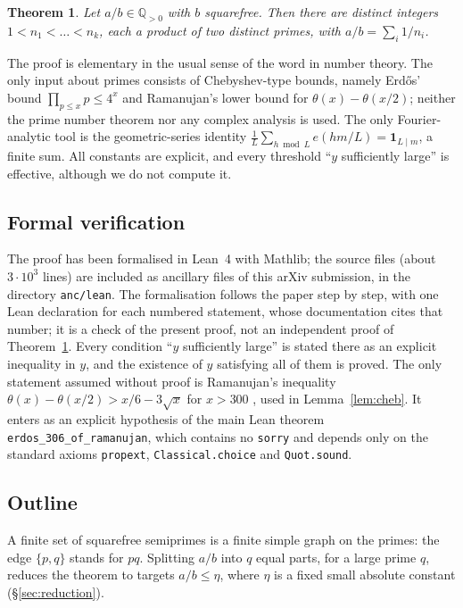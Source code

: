 \documentclass[11pt]{amsart}
\newtheorem{theorem}{Theorem}[section]
\theoremstyle{definition}
\theoremstyle{remark}
\newcommand{\Q}{\mathbb{Q}}
\begin{document}
\begin{theorem}\label{thm:main}
Let $a/b\in\Q_{>0}$ with $b$ squarefree. Then there are distinct integers $1<n_1<\dots<n_k$, each a product of two distinct primes, with $a/b=\sum_{i}1/n_i$.
\end{theorem}

The proof is elementary in the usual sense of the word in number theory. The only input about primes consists of Chebyshev-type bounds, namely Erd\H{o}s' bound $\prod_{p\le x}p\le4^x$ and Ramanujan's lower bound for $\theta(x)-\theta(x/2)$; neither the prime number theorem nor any complex analysis is used. The only Fourier-analytic tool is the geometric-series identity $\frac1L\sum_{h\bmod L}e(hm/L)=\mathbf 1_{L\mid m}$, a finite sum. All constants are explicit, and every threshold ``$y$ sufficiently large'' is effective, although we do not compute it.

\subsection*{Formal verification}\label{sec:lean}
The proof has been formalised in Lean~4 with Mathlib; the source files (about $3\cdot10^3$ lines) are included as ancillary files of this arXiv submission, in the directory \texttt{anc/lean}. The formalisation follows the paper step by step, with one Lean declaration for each numbered statement, whose documentation cites that number; it is a check of the present proof, not an independent proof of Theorem~\ref{thm:main}. Every condition ``$y$ sufficiently large'' is stated there as an explicit inequality in $y$, and the existence of $y$ satisfying all of them is proved. The only statement assumed without proof is Ramanujan's inequality $\theta(x)-\theta(x/2)>x/6-3\sqrt x$ for $x>300$ \cite{Ram19}, used in Lemma~\ref{lem:cheb}. It enters as an explicit hypothesis of the main Lean theorem \texttt{erdos\_306\_of\_ramanujan}, which contains no \texttt{sorry} and depends only on the standard axioms \texttt{propext}, \texttt{Classical.choice} and \texttt{Quot.sound}.

\subsection*{Outline}
A finite set of squarefree semiprimes is a finite simple graph on the primes: the edge $\{p,q\}$ stands for $pq$. Splitting $a/b$ into $q$ equal parts, for a large prime $q$, reduces the theorem to targets $a/b\le\eta$, where $\eta$ is a fixed small absolute constant (\S\ref{sec:reduction}).
\end{document}
